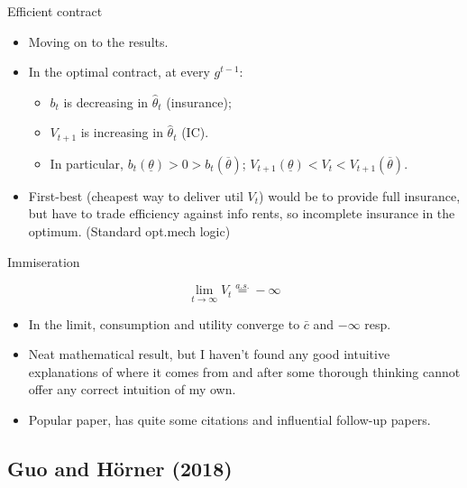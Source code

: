 \documentclass[english,10pt
,aspectratio=169
]{beamer}
\begin{document}
\begin{frame}{Efficient contract}
\begin{itemize}
	\item Moving on to the results.
	\item In the optimal contract, at every $g^{t-1}$:
	\begin{itemize}
		\item $b_t$ is decreasing in $\hat{\theta}_t$ (insurance);
		\item $V_{t+1}$ is increasing in $\hat{\theta}_t$ (IC).
		\item In particular, $b_t(\underline{\theta}) > 0 > b_t(\overline{\theta})$; $V_{t+1}(\underline{\theta}) < V_t < V_{t+1}(\overline{\theta})$.
	\end{itemize}
	\item First-best (cheapest way to deliver util $V_t$) would be to provide full insurance, but have to trade efficiency against info rents, so incomplete insurance in the optimum. (Standard opt.mech logic)
\end{itemize}
\end{frame}


\begin{frame}{Immiseration}
\begin{theorem}[Immiseration]
	$$\lim_{t\to \infty} V_t \overset{a.s.}{=} -\infty$$
\end{theorem}
\begin{itemize}
	\item In the limit, consumption and utility converge to $\bar{c}$ and $-\infty$ resp.
	\item Neat mathematical result, but I haven't found any good intuitive explanations of where it comes from and after some thorough thinking cannot offer any correct intuition of my own.
	\item Popular paper, has quite some citations and influential follow-up papers.
\end{itemize}
\end{frame}


\subsection{Guo and H{\"o}rner (2018)}
\end{document}
